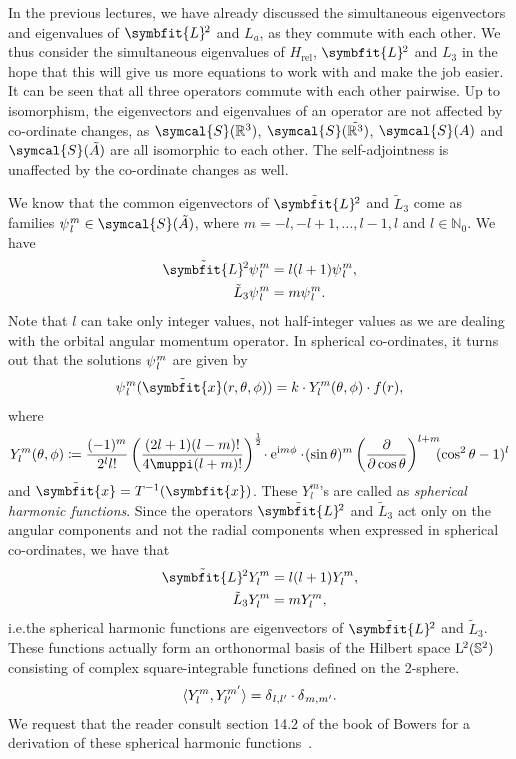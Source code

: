 \documentclass[12pt, a4 paper]{article}
\theoremstyle{definition}
\newcommand{\rthree}{\mathbb{R}^3}
\newcommand{\rr}{\mathbb{R}}
\newcommand{\nn}{\mathbb{N}_0}
\newcommand{\schwartz}{\symcal{S}}
\newcommand{\schwartzrthree}{\schwartz(\rr^3)}
\renewcommand{\i}{\mathrm{i}}
\newcommand{\e}{\mathrm{e}}
\renewcommand{\pi}{\muppi}
\newcommand{\lvecsquare}{\tilde{\symbfit{L}}\kern-1pt^2}
\begin{document}
	In the previous lectures, we have already discussed the simultaneous eigenvectors and eigenvalues of $\symbfit{L}\kern-1pt^2$ and $L_a$, as they commute with each other. We thus consider the simultaneous eigenvalues of $H_\text{rel}$, $\symbfit{L}\kern-1pt^2$ and $L_3$ in the hope that this will give us more equations to work with and make the job easier. It can be seen that all three operators commute with each other pairwise. Up to isomorphism, the eigenvectors and eigenvalues of an operator are not affected by co-ordinate changes, as $\schwartzrthree$, $\schwartz(\tilde{\rthree})$, $\schwartz(A)$ and $\schwartz(\tilde{A})$ are all isomorphic to each other. The self-adjointness is unaffected by the co-ordinate changes as well.

	We know that the common eigenvectors of $\lvecsquare$ and $\tilde{L}_3$ come as families $\psi\kern0.5pt_l^m \in \schwartz(\tilde{A})$, where $m = -l, -l+1, \ldots, l-1, l$ and $l \in \nn$. We have
	\begin{align*}
	    \lvecsquare \psi\kern0.5pt_l^m &= l(l+1)\psi\kern0.5pt_l^m,\\
		\tilde{L}_3 \psi\kern0.5pt_l^m &= m \psi\kern0.5pt_l^m.
	\end{align*}
	Note that $l$ can take only integer values, not half-integer values as we are dealing with the orbital angular momentum operator. In spherical co-ordinates, it turns out that the solutions $\psi\kern0.5pt_l^m$ are given by
	\begin{align*}
		\psi\kern0.5pt_l^m (\tilde{\symbfit{x}} (r, \theta, \phi)) = k \cdot Y^m_l (\theta, \phi) \cdot f(r),
	\end{align*}
	where
	\begin{align*}
		Y^m_l (\theta, \phi) \coloneq \frac{(-1)^m}{2^l l!}\left(\frac{(2l+1) (l-m)!}{4\pi (l+m)!}\right)^{\frac{1}{2}}\!\cdot\e^{\i m\phi}\cdot\!(\sin{\theta})^m \left(\frac{\partial}{\partial \cos{\theta}}\right)^{l+m}\!\!\!(\cos^2{\theta} -1)^l
	\end{align*}
	and $\tilde{\symbfit{x}} = T^{-1}(\symbfit{x})$. These $Y_l^m$'s are called as \textit{spherical harmonic functions}. Since the operators $\lvecsquare$ and $\tilde{L}_3$ act only on the angular components and not the radial components when expressed in spherical co-ordinates, we have that
	\begin{align*}
	    \lvecsquare Y_l^m &= l(l+1) Y_l^m,\\
		\tilde{L}_3 Y_l^m &= m Y_l^m,
	\end{align*}
	i.e.\@ the spherical harmonic functions are eigenvectors of $\lvecsquare$ and $\tilde{L}_3$. These functions actually form an orthonormal basis of the Hilbert space $\mathrm{L}\kern-0.7pt^2(\mathbb{S}^2)$ consisting of complex square-integrable functions defined on the 2-sphere.
	\begin{align*}
		\langle Y_l^m , Y_{l'}^{m'} \rangle = \delta\kern0.5pt_{l, l'}\cdot\delta\kern0.4pt_{m, m'}.
	\end{align*}
	We request that the reader consult section 14.2 of the book of Bowers for a derivation of these spherical harmonic functions~\cite[p.~200]{Bowers}.
\end{document}
